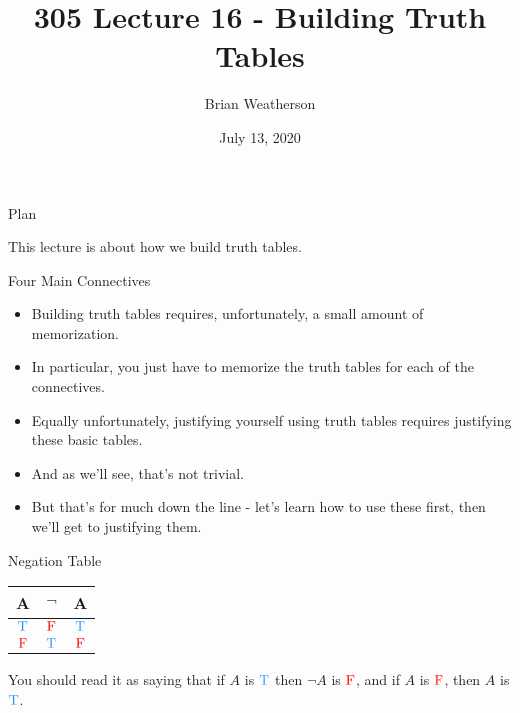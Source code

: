 \documentclass[
  ignorenonframetext,
]{beamer}
\title{305 Lecture 16 - Building Truth Tables}
\author{Brian Weatherson}
\date{July 13, 2020}
\providecommand{\tightlist}{%
  \setlength{\itemsep}{0pt}\setlength{\parskip}{0pt}}
\renewcommand{\,}{\text{, }}
\def\True{\textcolor{dodgerblue}{\text{T}}}
\def\False{\textcolor{red}{\text{F}}}
\begin{document}
\frame{\titlepage}

\begin{frame}{Plan}
\protect\hypertarget{plan}{}

This lecture is about how we build truth tables.

\end{frame}

\begin{frame}{Four Main Connectives}
\protect\hypertarget{four-main-connectives}{}

\begin{itemize}
\tightlist
\item
  Building truth tables requires, unfortunately, a small amount of
  memorization.
\item
  In particular, you just have to memorize the truth tables for each of
  the connectives.
\item
  Equally unfortunately, justifying yourself using truth tables requires
  justifying these basic tables.
\item
  And as we'll see, that's not trivial.
\item
  But that's for much down the line - let's learn how to use these
  first, then we'll get to justifying them.
\end{itemize}

\end{frame}

\begin{frame}{Negation Table}
\protect\hypertarget{negation-table}{}

\begin{center}
\begin{tabular}{@{ }c | c@{ }@{ }c}
A & $\neg$ & A\\
\hline 
$\True$ & \textcolor{red}{$\False$} & $\True$\\
$\False$ & \textcolor{red}{$\True$} & $\False$\\
\end{tabular}
\bigskip
\end{center}

You should read it as saying that if \(A\) is \(\True\) then \(\neg A\)
is \(\False\), and if \(A\) is \(\False\), then \(A\) is \(\True\).

\end{frame}
\end{document}
